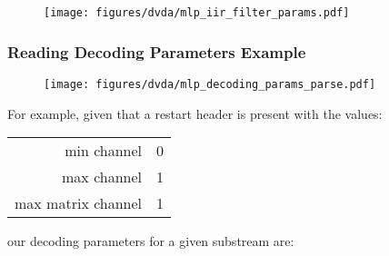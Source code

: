 \begin{figure}[h]
  \texttt{[image: figures/dvda/mlp\_iir\_filter\_params.pdf]}
\end{figure}

\clearpage

\subsubsection{Reading Decoding Parameters Example}

\begin{figure}[h]
  \texttt{[image: figures/dvda/mlp\_decoding\_params\_parse.pdf]}
\end{figure}

\clearpage

For example, given that a restart header is present with the values:
\begin{table}[h]
  {
    \begin{tabular}{rl}
      min channel & 0 \\
      max channel & 1 \\
      max matrix channel & 1 \\
    \end{tabular}
  }
\end{table}
\par
\noindent
our decoding parameters for a given substream are:
